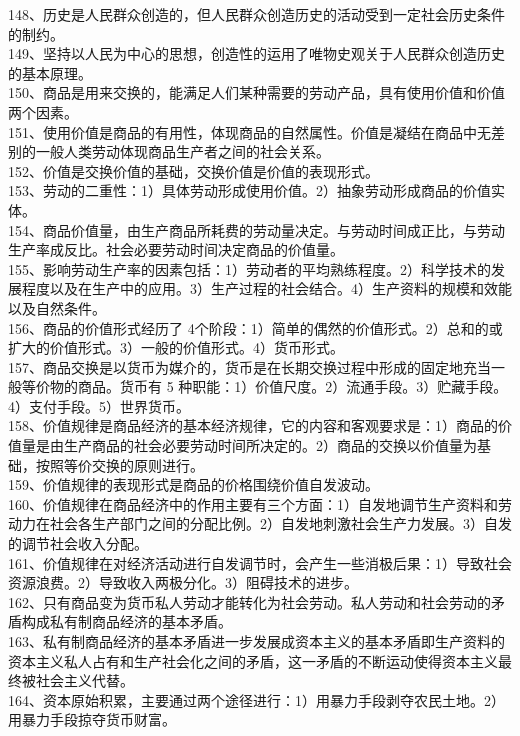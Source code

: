 \documentclass[a4paper,fleqn]{article}
\begin{document}
148、历史是人民群众创造的，但人民群众创造历史的活动受到一定社会历史条件的制约。 \\
149、坚持以人民为中心的思想，创造性的运用了唯物史观关于人民群众创造历史的基本原理。 \\
150、商品是用来交换的，能满足人们某种需要的劳动产品，具有使用价值和价值两个因素。 \\
151、使用价值是商品的有用性，体现商品的自然属性。价值是凝结在商品中无差别的一般人类劳动体现商品生产者之间的社会关系。 \\
152、价值是交换价值的基础，交换价值是价值的表现形式。 \\
153、劳动的二重性：1）具体劳动形成使用价值。2）抽象劳动形成商品的价值实体。 \\
154、商品价值量，由生产商品所耗费的劳动量决定。与劳动时间成正比，与劳动生产率成反比。社会必要劳动时间决定商品的价值量。 \\
155、影响劳动生产率的因素包括：1）劳动者的平均熟练程度。2）科学技术的发展程度以及在生产中的应用。3）生产过程的社会结合。4）生产资料的规模和效能以及自然条件。 \\
156、商品的价值形式经历了 4个阶段：1）简单的偶然的价值形式。2）总和的或扩大的价值形式。3）一般的价值形式。4）货币形式。 \\
157、商品交换是以货币为媒介的，货币是在长期交换过程中形成的固定地充当一般等价物的商品。货币有 5 种职能：1）价值尺度。2）流通手段。3）贮藏手段。4）支付手段。5）世界货币。 \\
158、价值规律是商品经济的基本经济规律，它的内容和客观要求是：1）商品的价值量是由生产商品的社会必要劳动时间所决定的。2）商品的交换以价值量为基础，按照等价交换的原则进行。 \\
159、价值规律的表现形式是商品的价格围绕价值自发波动。   \\
160、价值规律在商品经济中的作用主要有三个方面：1）自发地调节生产资料和劳动力在社会各生产部门之间的分配比例。2）自发地刺激社会生产力发展。3）自发的调节社会收入分配。 \\
161、价值规律在对经济活动进行自发调节时，会产生一些消极后果：1）导致社会资源浪费。2）导致收入两极分化。3）阻碍技术的进步。 \\
162、只有商品变为货币私人劳动才能转化为社会劳动。私人劳动和社会劳动的矛盾构成私有制商品经济的基本矛盾。 \\
163、私有制商品经济的基本矛盾进一步发展成资本主义的基本矛盾即生产资料的资本主义私人占有和生产社会化之间的矛盾，这一矛盾的不断运动使得资本主义最终被社会主义代替。 \\
164、资本原始积累，主要通过两个途径进行：1）用暴力手段剥夺农民土地。2）用暴力手段掠夺货币财富。 \\
\end{document}
